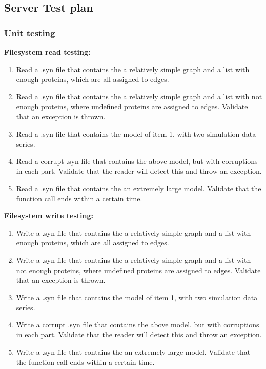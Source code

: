 \subsection{Server Test plan}
\subsubsection{Unit testing}
\textbf{Filesystem read testing:
}\begin{enumerate}
\item Read a .syn file that contains the a relatively simple graph  and a list with enough proteins, which are all assigned to edges.

\item Read a .syn file that contains the a relatively simple graph  and a list with not enough proteins, where undefined proteins are assigned to edges. Validate that an exception is thrown.\item Read a .syn file that contains the  model of item 1, with two simulation data series.
\item Read a corrupt .syn file that contains the above model, but with corruptions in each part.
Validate that the reader will detect this and throw an exception.
\item Read a .syn file that contains the an extremely large model. Validate that the function call ends within a certain time.\end{enumerate}

\noindent \textbf{Filesystem write testing:}

\begin{enumerate}
\item Write a .syn file that contains the a relatively simple graph  and a list with enough proteins, which are all assigned to edges.

\item Write a .syn file that contains the a relatively simple graph  and a list with not enough proteins, where undefined proteins are assigned to edges. Validate that an exception is thrown.\item Write a .syn file that contains the  model of item 1, with two simulation data series.
\item Write a corrupt .syn file that contains the above model, but with corruptions in each part.
Validate that the reader will detect this and throw an exception.
\item Write a .syn file that contains the an extremely large model. Validate that the function call ends within a certain time.\end{enumerate}

